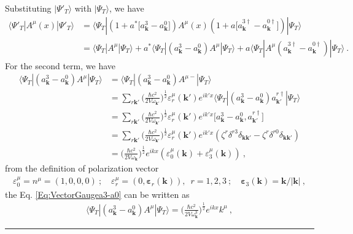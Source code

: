 \documentclass[12pt]{report}
\numberwithin{problemname}{chapter}
\newenvironment{solution}{\vspace{1em}\par\noindent{\large\textbf{\textsc{Solution}}}\par}{\vspace{1em}\hrule}
\begin{document}
\begin{solution}
Substituting $|\Psi'_T\rangle$ with $|\Psi_T\rangle$, we have
\begin{align}
    \langle\Psi'_T|A^{\mu}(x)|\Psi'_T\rangle &=\langle\Psi_T|(1+a^*\bigg[a^{3}_{\mathbf{k}}-a^{0}_{\mathbf{k}}\bigg])A^{\mu}(x)(1+a\bigg[a^{3\dagger}_{\mathbf{k}}-a^{0\dagger}_{\mathbf{k}}\bigg])|\Psi_T\rangle \nonumber \\
    &=\langle\Psi_T|A^{\mu}|\Psi_T\rangle+a^*\langle\Psi_T|(a^{3}_{\mathbf{k}}-a^{0}_{\mathbf{k}})A^{\mu}|\Psi_T\rangle+a\langle\Psi_T|A^{\mu}(a^{3\dagger}_{\mathbf{k}}-a^{0\dagger}_{\mathbf{k}})|\Psi_T\rangle\ .
\end{align}
For the second term, we have
\begin{align}
    \langle\Psi_T|(a^{3}_{\mathbf{k}}-a^{0}_{\mathbf{k}})A^{\mu}|\Psi_T\rangle &=\langle\Psi_T|(a^{3}_{\mathbf{k}}-a^{0}_{\mathbf{k}})A^{\mu-}|\Psi_T\rangle \nonumber \\
    &=\sum_{r\mathbf{k'}}\bigg(\frac{\hbar c^2}{2V\omega_{\mathbf{k'}}}\bigg)^{\frac{1}{2}}\varepsilon_r^{\mu}(\mathbf{k'})e^{ik'x}\langle\Psi_T|(a^{3}_{\mathbf{k}}-a^{0}_{\mathbf{k}})a^{r\dagger}_{\mathbf{k'}}|\Psi_T\rangle \nonumber \\
    &=\sum_{r\mathbf{k'}}\bigg(\frac{\hbar c^2}{2V\omega_{\mathbf{k'}}}\bigg)^{\frac{1}{2}}\varepsilon_r^{\mu}(\mathbf{k'})e^{ik'x}\bigg[a^{3}_{\mathbf{k}}-a^{0}_{\mathbf{k}}, a^{r\dagger}_{\mathbf{k'}}\bigg] \nonumber \\
    &=\sum_{r\mathbf{k'}}\bigg(\frac{\hbar c^2}{2V\omega_{\mathbf{k'}}}\bigg)^{\frac{1}{2}}\varepsilon_r^{\mu}(\mathbf{k'})e^{ik'x}(\zeta^r\delta^{r3}\delta_{\mathbf{kk'}}-\zeta^r\delta^{r0}\delta_{\mathbf{kk'}}) \nonumber \\
    &=\bigg(\frac{\hbar c^2}{2V\omega_{\mathbf{k}}}\bigg)^{\frac{1}{2}}e^{ikx}(\varepsilon_0^{\mu}(\mathbf{k})+\varepsilon_3^{\mu}(\mathbf{k})) \ , \label{Eq:VectorGaugea3-a0}
\end{align}
from the definition of polarization vector
\begin{align}
    \varepsilon_0^{\mu}=n^{\mu}=(1,0,0,0)\ ;\quad \varepsilon_r^{\mu}=(0,\bm{\varepsilon}_r(\mathbf{k})),\enspace r=1,2,3\ ;\quad \bm{\varepsilon}_3(\mathbf{k})=\mathbf{k}/|\mathbf{k}|\ ,
\end{align}
the Eq. \eqref{Eq:VectorGaugea3-a0} can be written as 
\begin{align}
    \langle\Psi_T|(a^{3}_{\mathbf{k}}-a^{0}_{\mathbf{k}})A^{\mu}|\Psi_T\rangle=\bigg(\frac{\hbar c^2}{2V\omega_{\mathbf{k}}^3}\bigg)^{\frac{1}{2}}e^{ikx}k^{\mu}\ ,

\end{align}
\end{solution}
\end{document}
